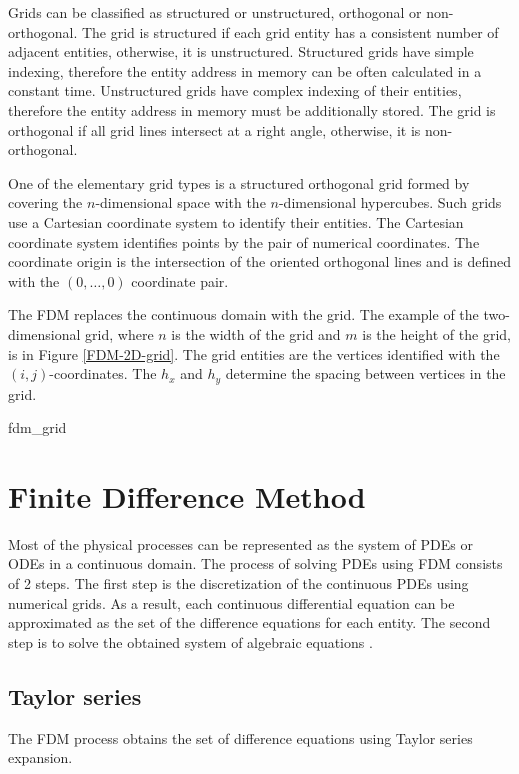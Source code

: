 Grids can be classified as structured or unstructured, orthogonal or non-orthogonal.
The grid is structured if each grid entity has a consistent number of adjacent entities, otherwise, it is unstructured.
Structured grids have simple indexing, therefore the entity address in memory can be often calculated in a constant time.
Unstructured grids have complex indexing of their entities, therefore the entity address in memory must be additionally stored.
The grid is orthogonal if all grid lines intersect at a right angle, otherwise, it is non-orthogonal.

One of the elementary grid types is a structured orthogonal grid formed by covering the \(n\)-dimensional space with the \(n\)-dimensional hypercubes.
Such grids use a Cartesian coordinate system to identify their entities.
The Cartesian coordinate system identifies points by the pair of numerical coordinates.
The coordinate origin is the intersection of the oriented orthogonal lines and is defined with the \((0, \dots,0)\) coordinate pair.

The FDM replaces the continuous domain with the grid.
The example of the two-dimensional grid, where \(n\) is the width of the grid and \(m\) is the height of the grid, is in Figure \ref{FDM-2D-grid}.
The grid entities are the vertices identified with the \((i,j)\)-coordinates.
The \(h_x\) and \(h_y\) determine the spacing between vertices in the grid.

{fdm_grid}

\section{Finite Difference Method}

Most of the physical processes can be represented as the system of PDEs or ODEs in a continuous domain.
The process of solving PDEs using FDM consists of 2 steps.
The first step is the discretization of the continuous PDEs using numerical grids.
As a result, each continuous differential equation can be approximated as the set of the difference equations for each entity.
The second step is to solve the obtained system of algebraic equations \cite{roychowdhury-2020}.

\subsection{Taylor series}

The FDM process obtains the set of difference equations using Taylor series expansion.

